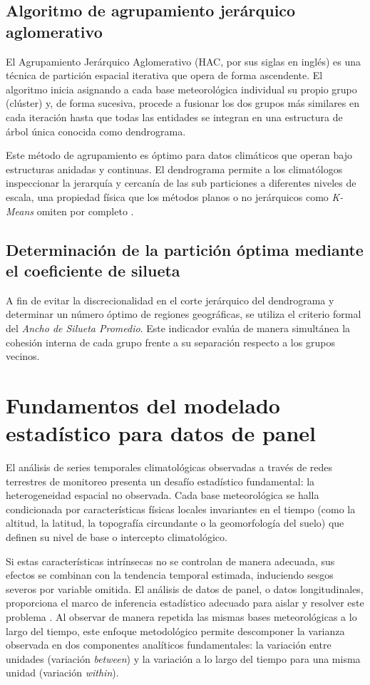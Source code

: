 \subsection{Algoritmo de agrupamiento jerárquico aglomerativo}

El Agrupamiento Jerárquico Aglomerativo (HAC, por sus siglas en inglés) es una técnica de partición espacial iterativa que opera de forma ascendente. El algoritmo inicia asignando a cada base meteorológica individual su propio grupo (clúster) y, de forma sucesiva, procede a fusionar los dos grupos más similares en cada iteración hasta que todas las entidades se integran en una estructura de árbol única conocida como dendrograma.

Este método de agrupamiento es óptimo para datos climáticos que operan bajo estructuras anidadas y continuas. El dendrograma permite a los climatólogos inspeccionar la jerarquía y cercanía de las sub particiones a diferentes niveles de escala, una propiedad física que los métodos planos o no jerárquicos como \textit{K-Means} omiten por completo \cite{gong1995}.

\subsection{Determinación de la partición óptima mediante el coeficiente de silueta}

A fin de evitar la discrecionalidad en el corte jerárquico del dendrograma y determinar un número óptimo de regiones geográficas, se utiliza el criterio formal del \textit{Ancho de Silueta Promedio}. Este indicador evalúa de manera simultánea la cohesión interna de cada grupo frente a su separación respecto a los grupos vecinos.

\section{Fundamentos del modelado estadístico para datos de panel}

El análisis de series temporales climatológicas observadas a través de redes terrestres de monitoreo presenta un desafío estadístico fundamental: la heterogeneidad espacial no observada. Cada base meteorológica se halla condicionada por características físicas locales invariantes en el tiempo (como la altitud, la latitud, la topografía circundante o la geomorfología del suelo) que definen su nivel de base o intercepto climatológico.

Si estas características intrínsecas no se controlan de manera adecuada, sus efectos se combinan con la tendencia temporal estimada, induciendo sesgos severos por variable omitida. El análisis de datos de panel, o datos longitudinales, proporciona el marco de inferencia estadístico adecuado para aislar y resolver este problema \cite{wooldridge2010}. Al observar de manera repetida las mismas bases meteorológicas a lo largo del tiempo, este enfoque metodológico permite descomponer la varianza observada en dos componentes analíticos fundamentales: la variación entre unidades (variación \textit{between}) y la variación a lo largo del tiempo para una misma unidad (variación \textit{within}).

